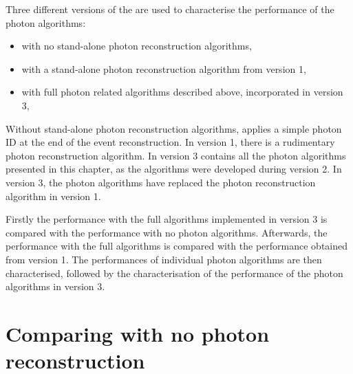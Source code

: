 
Three different versions of the \pandora are used to characterise  the performance of the photon algorithms:
\begin{itemize}
  \item with no stand-alone photon reconstruction algorithms,
  \item with a stand-alone photon reconstruction algorithm from \pandora version 1,
  \item with full photon related algorithms described above, incorporated in \pandora version 3,
\end{itemize}

Without stand-alone photon reconstruction algorithms, \pandora applies a simple photon ID at the end of the event reconstruction. In \pandora version 1, there is a rudimentary photon reconstruction algorithm. In \pandora version 3 contains all the photon algorithms presented in this chapter, as the algorithms  were developed during \pandora version 2. In \pandora version 3, the photon algorithms  have replaced the   photon reconstruction algorithm in \pandora version 1.

Firstly the performance with the full algorithms implemented in \pandora version 3 is compared with the performance with no photon algorithms. Afterwards, the performance with  the full algorithms is compared with the performance obtained from  \pandora version 1. The performances of individual photon algorithms are then characterised, followed by the characterisation of the performance of the photon algorithms in \pandora version 3.

\section{Comparing with no photon reconstruction}

